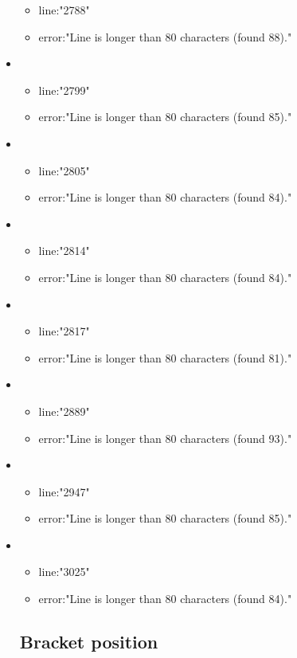 \begin{itemize}
\begin{itemize}
		\item line:"2788" 
		\item error:"Line is longer than 80 characters (found 88)." 
	\end{itemize}
	\item 
	\begin{itemize} 
		\item line:"2799" 
		\item error:"Line is longer than 80 characters (found 85)." 
	\end{itemize}
	\item 
	\begin{itemize} 
		\item line:"2805" 
		\item error:"Line is longer than 80 characters (found 84)." 
	\end{itemize}
	\item 
	\begin{itemize} 
		\item line:"2814" 
		\item error:"Line is longer than 80 characters (found 84)." 
	\end{itemize}
	\item 
	\begin{itemize} 
		\item line:"2817" 
		\item error:"Line is longer than 80 characters (found 81)." 
	\end{itemize}
	\item 
	\begin{itemize} 
		\item line:"2889" 
		\item error:"Line is longer than 80 characters (found 93)." 
	\end{itemize}
	\item 
	\begin{itemize} 
		\item line:"2947" 
		\item error:"Line is longer than 80 characters (found 85)." 
	\end{itemize}
	\item 
	\begin{itemize} 
		\item line:"3025" 
		\item error:"Line is longer than 80 characters (found 84)." 
	\end{itemize}
\subsection{Bracket position} %
\label{sub:bracket_position}



\end{itemize}
